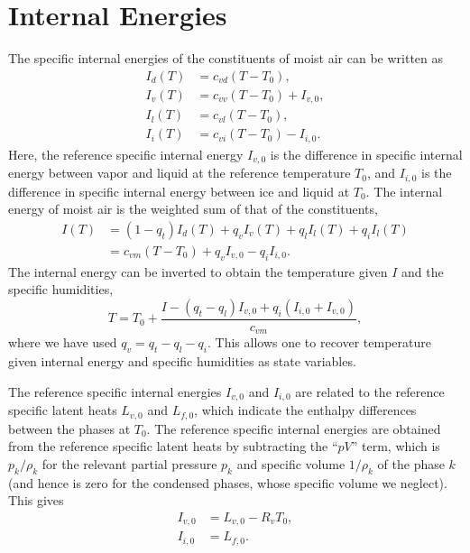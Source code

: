 \documentclass{report}
\begin{document}
\section{Internal Energies}\label{s:internal_energies}

The specific internal energies of the constituents of moist air can be written as
\begin{subequations}\label{e:internal_energies}
\begin{align}
I_d(T) & = c_{vd} (T - T_0),  \\
I_v(T) & = c_{vv} (T - T_0) + I_{v,0},\\
I_l(T) & = c_{vl} (T - T_0), \\
I_i(T) & = c_{vi} (T - T_0) - I_{i,0}.
\end{align}
\end{subequations}
Here, the reference specific internal energy $I_{v,0}$ is the difference in specific internal energy between vapor and liquid at the reference temperature $T_0$, and $I_{i,0}$ is the difference in specific internal energy between ice and liquid at $T_0$. The internal energy of moist air is the weighted sum of that of the constituents,
\begin{equation}
\begin{split}
     I(T) & = (1-q_t) I_d(T) + q_v I_v(T) + q_l I_l(T) + q_i I_l(T)\\
          & = c_{vm} (T - T_0)  + q_v I_{v,0} - q_i I_{i,0}.
     \label{eq:total_internal_energy}
\end{split}
\end{equation}
The internal energy can be inverted to obtain the temperature given $I$ and the specific humidities,
\begin{equation}
    T = T_0 + \frac{I - (q_t - q_l) I_{v,0} + q_i (I_{i,0} + I_{v,0})}{c_{vm}},
    \label{eq:temperature}
\end{equation}
where we have used $q_v = q_t - q_l - q_i$. This allows one to recover temperature given internal energy and specific humidities as state variables.

The reference specific internal energies $I_{v,0}$ and $I_{i,0}$ are related to the reference specific latent heats $L_{v,0}$ and $L_{f,0}$, which indicate the enthalpy differences between the phases at $T_0$. The reference specific internal energies are obtained from the reference specific latent heats by subtracting the ``$pV$'' term, which is $p_k/\rho_k$ for the relevant partial pressure $p_k$ and specific volume $1/\rho_k$ of the phase $k$ (and hence is zero for the condensed phases, whose specific volume we neglect). This gives
\begin{subequations}\label{e:ref_internal_energies}
\begin{align}
     I_{v,0} &= L_{v, 0} - R_v T_0,\\
     I_{i,0} &= L_{f, 0}.
\end{align}
\end{subequations}
   
\end{document}

